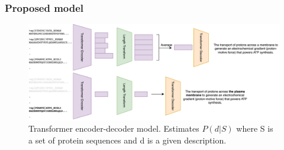 \documentclass{beamer}
\begin{document}



\begin{frame}
\frametitle{Proposed model}
\begin{figure}
    \centering
    \includegraphics[width=0.9\linewidth]{prot2go.png}
    \caption{Transformer encoder-decoder model. Estimates $P(d|S)$ where S is a set of protein sequences and d is a given description.}
    \label{overview}
\end{figure}

\end{frame}
\end{document}
